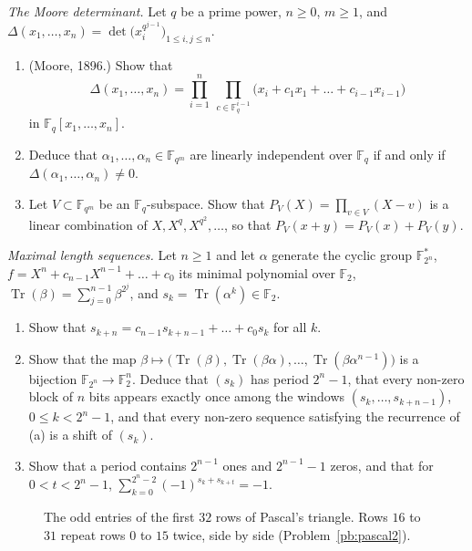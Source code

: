 \begin{exercise}[$\star\star\star$]\label{pb:moore}
\emph{The Moore determinant.} Let $q$ be a prime power, $n\ge0$, $m\ge1$, and $\Delta(x_1,\dots,x_n)=\det\bigl(x_i^{q^{j-1}}\bigr)_{1\le i,j\le n}$.
\begin{enumerate}[label=(\alph*)]
\item (Moore, 1896.) Show that
\[
\Delta(x_1,\dots,x_n)=\prod_{i=1}^n\ \prod_{c\in\mathbb F_q^{i-1}}\bigl(x_i+c_1x_1+\dots+c_{i-1}x_{i-1}\bigr)
\]
in $\mathbb F_q[x_1,\dots,x_n]$.
\item Deduce that $\alpha_1,\dots,\alpha_n\in\mathbb F_{q^m}$ are linearly independent over $\mathbb F_q$ if and only if
$\Delta(\alpha_1,\dots,\alpha_n)\ne0$.
\item Let $V\subset\mathbb F_{q^m}$ be an $\mathbb F_q$-subspace. Show that $P_V(X)=\prod_{v\in V}(X-v)$ is a linear combination
of $X,X^q,X^{q^2},\dots$, so that $P_V(x+y)=P_V(x)+P_V(y)$.
\end{enumerate}
\end{exercise}

\begin{exercise}[$\star\star$]\label{pb:mseq}
\emph{Maximal length sequences.} Let $n\ge1$ and let $\alpha$ generate the cyclic group $\mathbb F_{2^n}^*$, $f=X^n+c_{n-1}X^{n-1}+\dots+c_0$ its
minimal polynomial over $\mathbb F_2$, $\operatorname{Tr}(\beta)=\sum_{j=0}^{n-1}\beta^{2^j}$, and
$s_k=\operatorname{Tr}(\alpha^k)\in\mathbb F_2$.
\begin{enumerate}[label=(\alph*)]
\item Show that $s_{k+n}=c_{n-1}s_{k+n-1}+\dots+c_0s_k$ for all $k$.
\item Show that the map $\beta\mapsto\bigl(\operatorname{Tr}(\beta),\operatorname{Tr}(\beta\alpha),\dots,\operatorname{Tr}(\beta\alpha^{n-1})\bigr)$ is a bijection
$\mathbb F_{2^n}\to\mathbb F_2^n$. Deduce that $(s_k)$ has period $2^n-1$, that every non-zero block of $n$ bits appears exactly
once among the windows $(s_k,\dots,s_{k+n-1})$, $0\le k<2^n-1$, and that every non-zero sequence satisfying the recurrence of (a)
is a shift of $(s_k)$.
\item Show that a period contains $2^{n-1}$ ones and $2^{n-1}-1$ zeros, and that for $0<t<2^n-1$,
$\sum_{k=0}^{2^n-2}(-1)^{s_k+s_{k+t}}=-1$.
\end{enumerate}
\end{exercise}

\begin{figure}[ht]
\centering
{}
\caption{The odd entries of the first $32$ rows of Pascal's triangle. Rows $16$ to $31$ repeat rows $0$ to $15$ twice, side
by side (Problem~\ref{pb:pascal2}).}
\label{fig:pascal}
\end{figure}

